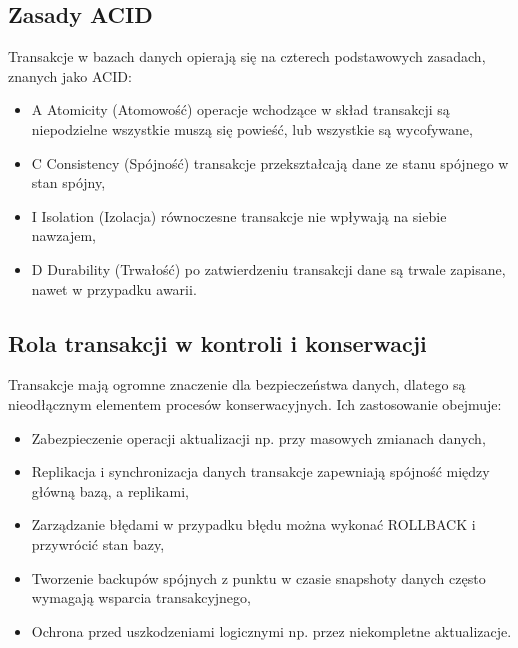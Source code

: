 \documentclass[a4paper,11pt,polish]{sphinxmanual}
\begin{document}
\subsection{Zasady ACID}
\label{\detokenize{Kontrola_i_konserwacja/kontrola_i_konserwacja:zasady-acid}}
\sphinxAtStartPar
Transakcje w bazach danych opierają się na czterech podstawowych zasadach, znanych jako ACID:
\begin{itemize}
\item {} 
\sphinxAtStartPar
A \sphinxhyphen{} Atomicity (Atomowość) \sphinxhyphen{} operacje wchodzące w skład transakcji są niepodzielne \sphinxhyphen{} wszystkie muszą się powieść, lub wszystkie są wycofywane,

\item {} 
\sphinxAtStartPar
C \sphinxhyphen{} Consistency (Spójność) \sphinxhyphen{} transakcje przekształcają dane ze stanu spójnego w stan spójny,

\item {} 
\sphinxAtStartPar
I \sphinxhyphen{} Isolation (Izolacja) \sphinxhyphen{} równoczesne transakcje nie wpływają na siebie nawzajem,

\item {} 
\sphinxAtStartPar
D \sphinxhyphen{} Durability (Trwałość) \sphinxhyphen{} po zatwierdzeniu transakcji dane są trwale zapisane, nawet w przypadku awarii.

\end{itemize}


\subsection{Rola transakcji w kontroli i konserwacji}
\label{\detokenize{Kontrola_i_konserwacja/kontrola_i_konserwacja:rola-transakcji-w-kontroli-i-konserwacji}}
\sphinxAtStartPar
Transakcje mają ogromne znaczenie dla bezpieczeństwa danych, dlatego są nieodłącznym elementem procesów konserwacyjnych. Ich zastosowanie obejmuje:
\begin{itemize}
\item {} 
\sphinxAtStartPar
Zabezpieczenie operacji aktualizacji \sphinxhyphen{} np. przy masowych zmianach danych,

\item {} 
\sphinxAtStartPar
Replikacja i synchronizacja danych \sphinxhyphen{} transakcje zapewniają spójność między główną bazą, a replikami,

\item {} 
\sphinxAtStartPar
Zarządzanie błędami \sphinxhyphen{} w przypadku błędu można wykonać ROLLBACK i przywrócić stan bazy,

\item {} 
\sphinxAtStartPar
Tworzenie backupów spójnych z punktu w czasie \sphinxhyphen{} snapshoty danych często wymagają wsparcia transakcyjnego,

\item {} 
\sphinxAtStartPar
Ochrona przed uszkodzeniami logicznymi \sphinxhyphen{} np. przez niekompletne aktualizacje.

\end{itemize}
\end{document}
